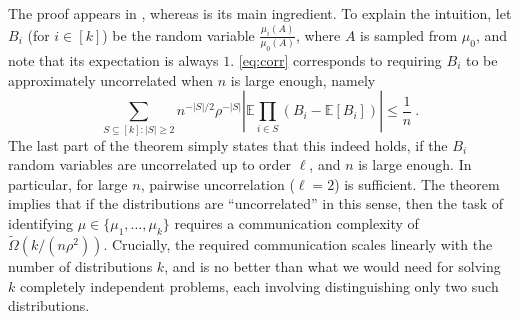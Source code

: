 The proof appears in , whereas  is its main ingredient.
To explain the intuition, let $B_i$ (for $i\in[k]$) be the random variable $\frac{\mu_i(A)}{\mu_0(A)}$, where $A$ is sampled from $\mu_0$, and note that its expectation is always $1$. \eqref{eq:corr} corresponds to requiring $B_i$ to be approximately uncorrelated when $n$ is large enough, namely
\[
\sum_{S \subseteq [k] \colon \lvert S \rvert \ge 2} n^{-\lvert S \rvert/2} \rho^{-\lvert S \rvert} \left\lvert \mathbb{E}\prod_{i\in S} \left(B_i -\mathbb{E}[B_i]\right)\right\rvert
\le \frac{1}{n}~.
\]
The last part of the theorem simply states that this indeed holds, if the $B_i$ random variables are uncorrelated up to order $\ell$, and $n$ is large enough. In particular, for large $n$, pairwise uncorrelation ($\ell=2$) is sufficient. The theorem implies that if the distributions are ``uncorrelated'' in this sense, then the task of identifying $\mu \in \{ \mu_1, \dots, \mu_k\}$ requires a communication complexity of $\tilde\Omega(k/(n \rho^2))$. Crucially, the required communication scales linearly with the number of distributions $k$, and is no better than what we would need for solving $k$ completely independent problems, each involving distinguishing only two such distributions.


